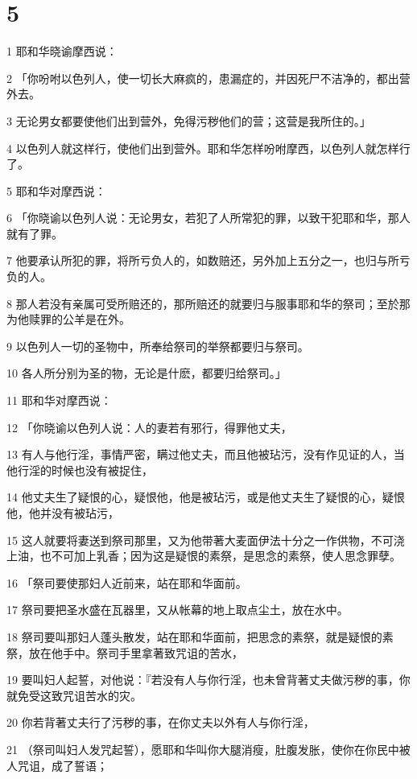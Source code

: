 \chapter{5}

\par 1 耶和华晓谕摩西说：
\par 2 「你吩咐以色列人，使一切长大麻疯的，患漏症的，并因死尸不洁净的，都出营外去。
\par 3 无论男女都要使他们出到营外，免得污秽他们的营；这营是我所住的。」
\par 4 以色列人就这样行，使他们出到营外。耶和华怎样吩咐摩西，以色列人就怎样行了。
\par 5 耶和华对摩西说：
\par 6 「你晓谕以色列人说：无论男女，若犯了人所常犯的罪，以致干犯耶和华，那人就有了罪。
\par 7 他要承认所犯的罪，将所亏负人的，如数赔还，另外加上五分之一，也归与所亏负的人。
\par 8 那人若没有亲属可受所赔还的，那所赔还的就要归与服事耶和华的祭司；至於那为他赎罪的公羊是在外。
\par 9 以色列人一切的圣物中，所奉给祭司的举祭都要归与祭司。
\par 10 各人所分别为圣的物，无论是什麽，都要归给祭司。」
\par 11 耶和华对摩西说：
\par 12 「你晓谕以色列人说：人的妻若有邪行，得罪他丈夫，
\par 13 有人与他行淫，事情严密，瞒过他丈夫，而且他被玷污，没有作见证的人，当他行淫的时候也没有被捉住，
\par 14 他丈夫生了疑恨的心，疑恨他，他是被玷污，或是他丈夫生了疑恨的心，疑恨他，他并没有被玷污，
\par 15 这人就要将妻送到祭司那里，又为他带著大麦面伊法十分之一作供物，不可浇上油，也不可加上乳香；因为这是疑恨的素祭，是思念的素祭，使人思念罪孽。
\par 16 「祭司要使那妇人近前来，站在耶和华面前。
\par 17 祭司要把圣水盛在瓦器里，又从帐幕的地上取点尘土，放在水中。
\par 18 祭司要叫那妇人蓬头散发，站在耶和华面前，把思念的素祭，就是疑恨的素祭，放在他手中。祭司手里拿著致咒诅的苦水，
\par 19 要叫妇人起誓，对他说：『若没有人与你行淫，也未曾背著丈夫做污秽的事，你就免受这致咒诅苦水的灾。
\par 20 你若背著丈夫行了污秽的事，在你丈夫以外有人与你行淫，
\par 21 （祭司叫妇人发咒起誓），愿耶和华叫你大腿消瘦，肚腹发胀，使你在你民中被人咒诅，成了誓语；
